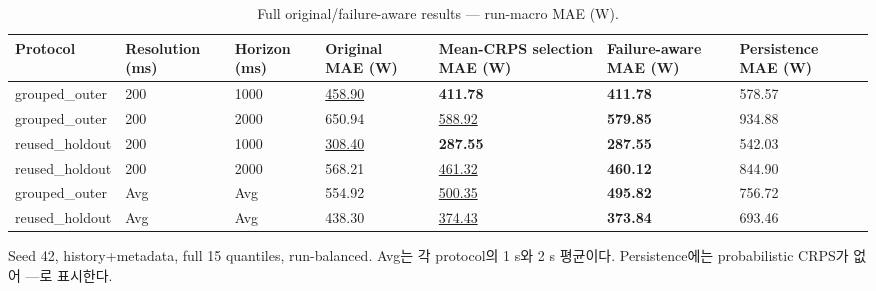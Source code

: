 \begin{table}[t]
\centering
\caption{Full original/failure-aware results — run-macro MAE (W).}
\label{tab:a2e_failure_aware_mae}
\small
\begin{tabular}{lllllll}
\toprule
Protocol & Resolution (ms) & Horizon (ms) & Original MAE (W) & Mean-CRPS selection MAE (W) & Failure-aware MAE (W) & Persistence MAE (W) \\
\midrule
grouped\_outer & 200 & 1000 & \underline{458.90} & \textbf{411.78} & \textbf{411.78} & 578.57 \\
grouped\_outer & 200 & 2000 & 650.94 & \underline{588.92} & \textbf{579.85} & 934.88 \\
reused\_holdout & 200 & 1000 & \underline{308.40} & \textbf{287.55} & \textbf{287.55} & 542.03 \\
reused\_holdout & 200 & 2000 & 568.21 & \underline{461.32} & \textbf{460.12} & 844.90 \\
grouped\_outer & Avg & Avg & 554.92 & \underline{500.35} & \textbf{495.82} & 756.72 \\
reused\_holdout & Avg & Avg & 438.30 & \underline{374.43} & \textbf{373.84} & 693.46 \\
\bottomrule
\end{tabular}
\vspace{2pt}\par\footnotesize Seed 42, history+metadata, full 15 quantiles, run-balanced. Avg는 각 protocol의 1 s와 2 s 평균이다. Persistence에는 probabilistic CRPS가 없어 —로 표시한다.
\end{table}

